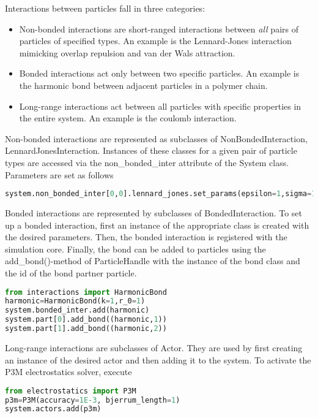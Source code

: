 Interactions between particles fall in three categories:
\begin{itemize}
\item Non-bonded interactions are short-ranged interactions between \emph{all} pairs of particles of specified types. An example is the Lennard-Jones interaction mimicking overlap repulsion and van der Wals attraction. 
\item Bonded interactions act only between two specific particles. An example is the harmonic bond between adjacent particles in a polymer chain.
\item Long-range interactions act between all particles with specific properties in the entire system. An example is the coulomb interaction.
\end{itemize}

Non-bonded interactions are represented as subclasses of NonBondedInteraction, \eg LennardJonesInteraction. Instances of these classes for a given pair of particle types are accessed via the non_bonded_inter attribute of the System class. Parameters are set as follows
\begin{lstlisting}[language=python]
system.non_bonded_inter[0,0].lennard_jones.set_params(epsilon=1,sigma=1,cutoff=1.5,shift="auto")
\end{lstlisting}


Bonded interactions are represented by subclasses of BondedInteraction. To set up a bonded interaction, first an instance of the appropriate class is created with the desired parameters. Then, the bonded interaction is registered with the simulation core. Finally, the bond can be added to particles using the add_bond()-method of ParticleHandle with the instance of the bond class and the id of the bond partner particle. 
\begin{lstlisting}[language=python]
from interactions import HarmonicBond
harmonic=HarmonicBond(k=1,r_0=1)
system.bonded_inter.add(harmonic)
system.part[0].add_bond((harmonic,1))
system.part[1].add_bond((harmonic,2))
\end{lstlisting}

Long-range interactions are subclasses of Actor. They are used by first creating an instance of the desired actor and then adding it to the system.
To activate the P3M electrostatics solver, execute
\begin{lstlisting}[language=python]
from electrostatics import P3M
p3m=P3M(accuracy=1E-3, bjerrum_length=1)
system.actors.add(p3m)
\end{lstlisting}

